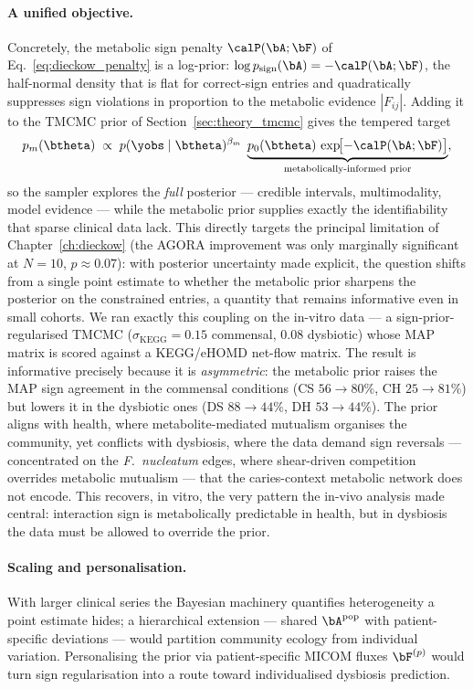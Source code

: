 \paragraph{A unified objective.}
Concretely, the metabolic sign penalty $\calP(\bA;\bF)$ of
Eq.~\eqref{eq:dieckow_penalty} is a log-prior: $\log p_{\mathrm{sign}}(\bA) =
-\calP(\bA;\bF)$, the half-normal density that is flat for correct-sign entries and
quadratically suppresses sign violations in proportion to the metabolic evidence
$|F_{ij}|$. Adding it to the TMCMC prior of Section~\ref{sec:theory_tmcmc} gives the
tempered target
\begin{equation}
  p_m(\btheta) \;\propto\; p(\yobs\mid\btheta)^{\beta_m}\;
    \underbrace{p_0(\btheta)\,
    \exp\!\bigl[-\calP(\bA;\bF)\bigr]}_{\text{metabolically-informed prior}},
  \label{eq:unified}
\end{equation}
so the sampler explores the \emph{full} posterior --- credible intervals,
multimodality, model evidence --- while the metabolic prior supplies exactly the
identifiability that sparse clinical data lack. This directly targets the principal
limitation of Chapter~\ref{ch:dieckow} (the AGORA improvement was only marginally
significant at $N=10$, $p\!\approx\!0.07$): with posterior uncertainty made explicit,
the question shifts from a single point estimate to whether the metabolic prior
sharpens the posterior on the constrained entries, a quantity that remains
informative even in small cohorts. We ran exactly this coupling on the in-vitro
data --- a sign-prior-regularised TMCMC ($\sigma_{\mathrm{KEGG}}=0.15$ commensal,
$0.08$ dysbiotic) whose MAP matrix is scored against a KEGG/eHOMD net-flow matrix.
The result is informative precisely because it is \emph{asymmetric}: the metabolic
prior raises the MAP sign agreement in the commensal conditions (CS $56\!\to\!80\%$,
CH $25\!\to\!81\%$) but lowers it in the dysbiotic ones (DS $88\!\to\!44\%$,
DH $53\!\to\!44\%$). The prior aligns with health, where metabolite-mediated
mutualism organises the community, yet conflicts with dysbiosis, where the data
demand sign reversals --- concentrated on the \textit{F.~nucleatum} edges, where
shear-driven competition overrides metabolic mutualism --- that the caries-context
metabolic network does not encode. This recovers, in vitro, the very pattern the
in-vivo analysis made central: interaction sign is metabolically predictable in
health, but in dysbiosis the data must be allowed to override the prior.

\paragraph{Scaling and personalisation.}
With larger clinical series the Bayesian machinery quantifies heterogeneity a point
estimate hides; a hierarchical extension --- shared $\bA^{\mathrm{pop}}$ with
patient-specific deviations --- would partition community ecology from individual
variation. Personalising the prior via patient-specific MICOM fluxes $\bF^{(p)}$
would turn sign regularisation into a route toward individualised dysbiosis prediction.

